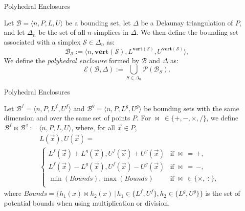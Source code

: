 \begin{frame}[fragile]{Polyhedral Enclosures}
    \begin{definition}
        Let $ \mathcal{B} = \langle n,P, L, U \rangle $ be a bounding set, let $\Delta$ be a Delaunay triangulation of $P$, and let $\Delta_n$ be the set of all $n$-simplices in $\Delta$. We then define the bounding set associated with a simplex $\mathcal{S} \in \Delta_n$ as:
        \[
        \mathcal{B}_{\mathcal{S}} := \langle n,\mathbf{vert}(\mathcal{S}), L^{\mathbf{vert}(\mathcal{S})}, U^{\mathbf{vert}(\mathcal{S})} \rangle,
        \]
        \vspace{0.5em} 
        \noindent
        We define the \emph{polyhedral enclosure} formed by $\mathcal{B}$ and $\Delta$ as:
        \[
        \mathcal{E}(\mathcal{B},\Delta) := \bigcup_{S\in\Delta_n} \mathcal{P}(\mathcal{B}_S).
        \]
        \end{definition}
        
\end{frame}

\begin{frame}[fragile]{Polyhedral Enclosures}
    \begin{definition}
        Let $\mathcal{B}^f = \langle n, P, L^f, U^f \rangle$ and $\mathcal{B}^g = \langle n, P, L^g, U^g \rangle$ be bounding sets with the same dimension and over the same set of points $P$.  For $\bowtie\ \in\{+,-,\times,/\}$, we define $\mathcal{B}^f \bowtie \mathcal{B}^g := \langle n, P, L, U \rangle$, where, for all $\vec{x} \in P$,
            \begin{align*} 
            &L(\vec{x}), U(\vec{x}) = \\
            &\begin{cases}
                L^f(\vec{x}) + L^g(\vec{x}), U^f(\vec{x}) + U^g(\vec{x}) & \text{if } \bowtie \, = \,+, \\[0.1ex]
                L^f(\vec{x}) - L^g(\vec{x}), U^f(\vec{x}) - U^g(\vec{x}) & \text{if } \bowtie \, = \,-, \\[0.1ex]
                \min(\mathit{Bounds}),\max(\mathit{Bounds})  & \text{if } \bowtie \, \in \{\times, \div\}, \\[0.1ex]
            \end{cases}
            \end{align*}
            where $\mathit{Bounds} = \{h_1(x) \bowtie h_2(x) \,|\, h_1 \in \{L^f, U^f\}, h_2 \in \{L^g, U^g\} \}$ is the set of potential bounds when using multiplication or division.
        \end{definition}
        
\end{frame}